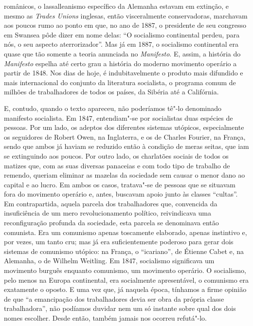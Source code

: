românicos, o lassalleanismo específico da Alemanha estavam em extinção,
e mesmo as \textit{Trades Unions} inglesas, então visceralmente
conservadoras, marchavam aos poucos rumo ao ponto em que, no ano de
1887, o presidente de seu congresso em Swansea pôde dizer em nome
delas: “O socialismo continental perdeu, para nós, o seu aspecto
aterrorizador”. Mas já em 1887, o socialismo continental era quase que
tão somente a teoria anunciada no \textit{Manifesto}. E, assim, a
história do \textit{Manifesto} espelha até certo grau a história do
moderno movimento operário a partir de 1848. Nos dias de hoje, é
indubitavelmente o produto mais difundido e mais internacional do
conjunto da literatura socialista, o programa comum de milhões de
trabalhadores de todos os países, da Sibéria até a Califórnia.

  E, contudo, quando o texto apareceu, não poderíamos tê"-lo denominado
manifesto socialista. Em 1847, entendiam"-se por socialistas duas
espécies de pessoas. Por um lado, os adeptos dos diferentes sistemas
utópicos, especialmente os seguidores de Robert Owen, na Inglaterra, e os
de Charles Fourier, na França, sendo que ambos já haviam se reduzido
então à condição de meras seitas, que iam se extinguindo aos poucos.
Por outro lado, os charlatões sociais de todos os matizes que, com as
suas diversas panaceias e com todo tipo de trabalho de remendo, queriam
eliminar as mazelas da sociedade sem causar o menor dano ao capital e
ao lucro. Em ambos os casos, tratava"-se de pessoas que se situavam
fora do movimento operário e, antes, buscavam apoio junto às classes
“cultas”. Em contrapartida, aquela parcela dos trabalhadores que,
convencida da insuficiência de um mero revolucionamento político,
reivindicava uma reconfiguração profunda da sociedade, esta parcela se
denominava então comunista. Era um comunismo apenas toscamente
elaborado, apenas instintivo e, por vezes, um tanto cru; mas já era
suficientemente poderoso para gerar dois sistemas de comunismo utópico:
na França, o “icariano”, de Étienne Cabet e, na Alemanha, o de Wilhelm
Weitling. Em 1847, socialismo significava um movimento burguês enquanto
comunismo, um movimento operário. O socialismo, pelo menos na Europa
continental, era socialmente apresentável, o comunismo era exatamente o
oposto. E uma vez que, já naquela época, tínhamos a firme opinião de
que “a emancipação dos trabalhadores devia ser obra da própria classe
trabalhadora”, não podíamos duvidar nem um só instante sobre qual dos
dois nomes escolher. Desde então, também jamais nos ocorreu
refutá"-lo. 

